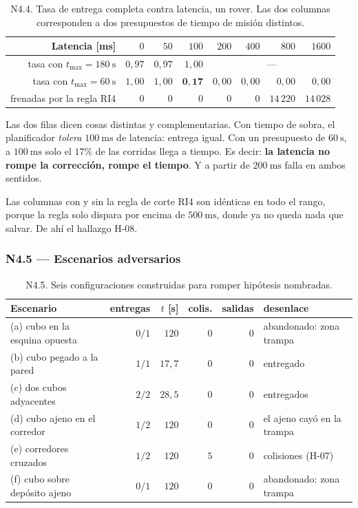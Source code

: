 \documentclass[11pt,a4paper]{article}
\begin{document}
\begin{table}[htbp]
\centering
\small
\caption{N4.4. Tasa de entrega completa contra latencia, un rover. Las dos columnas
corresponden a dos presupuestos de tiempo de misión distintos.}
\begin{tabular}{rrrrrrrr}
\toprule
Latencia [ms] & $0$ & $50$ & $100$ & $200$ & $400$ & $800$ & $1600$ \\
\midrule
tasa con $t_{\max}=180\ \mathrm{s}$ & $0{,}97$ & $0{,}97$ & $1{,}00$ & \multicolumn{4}{c}{---} \\
tasa con $t_{\max}=60\ \mathrm{s}$ & $1{,}00$ & $1{,}00$ & $\mathbf{0{,}17}$ & $0{,}00$ & $0{,}00$ & $0{,}00$ & $0{,}00$ \\
frenadas por la regla RI4 & $0$ & $0$ & $0$ & $0$ & $0$ & $14\,220$ & $14\,028$ \\
\bottomrule
\end{tabular}
\end{table}

Las dos filas dicen cosas distintas y complementarias. Con tiempo de sobra, el
planificador \emph{tolera} $100\ \mathrm{ms}$ de latencia: entrega igual. Con un
presupuesto de $60\ \mathrm{s}$, a $100\ \mathrm{ms}$ solo el $17\%$ de las corridas
llega a tiempo. Es decir: \textbf{la latencia no rompe la corrección, rompe el tiempo}.
Y a partir de $200\ \mathrm{ms}$ falla en ambos sentidos.

Las columnas con y sin la regla de corte RI4 son idénticas en todo el rango, porque la
regla solo dispara por encima de $500\ \mathrm{ms}$, donde ya no queda nada que salvar.
De ahí el hallazgo H-08.

\subsubsection{N4.5 --- Escenarios adversarios}

\begin{table}[htbp]
\centering
\small
\caption{N4.5. Seis configuraciones construidas para romper hipótesis nombradas.}
\begin{tabular}{lrrrrl}
\toprule
Escenario & entregas & $t$ [s] & colis. & salidas & desenlace \\
\midrule
(a) cubo en la esquina opuesta & $0/1$ & $120$ & $0$ & $0$ & abandonado: zona trampa \\
(b) cubo pegado a la pared & $1/1$ & $17{,}7$ & $0$ & $0$ & entregado \\
(c) dos cubos adyacentes & $2/2$ & $28{,}5$ & $0$ & $0$ & entregados \\
(d) cubo ajeno en el corredor & $1/2$ & $120$ & $0$ & $0$ & el ajeno cayó en la trampa \\
(e) corredores cruzados & $1/2$ & $120$ & $5$ & $0$ & colisiones (H-07) \\
(f) cubo sobre depósito ajeno & $0/1$ & $120$ & $0$ & $0$ & abandonado: zona trampa \\
\bottomrule
\end{tabular}
\end{table}
\end{document}
